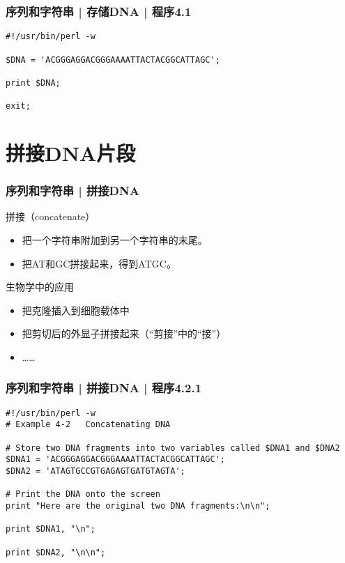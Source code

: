 \begin{frame}[fragile]
  \frametitle{序列和字符串 | 存储DNA | 程序4.1}
  \vspace{-1.5em}
\begin{lstlisting}
#!/usr/bin/perl -w

$DNA = 'ACGGGAGGACGGGAAAATTACTACGGCATTAGC';

print $DNA;

exit;
\end{lstlisting}
\end{frame}


\section{拼接DNA片段}
\begin{frame}
  \frametitle{序列和字符串 | 拼接DNA}
  \begin{block}{拼接（concatenate）}
    \begin{itemize}
      \item 把一个字符串附加到另一个字符串的末尾。
      \item 把AT和GC拼接起来，得到ATGC。
    \end{itemize}
  \end{block}
  \pause
  \begin{block}{生物学中的应用}
    \begin{itemize}
      \item 把克隆插入到细胞载体中
      \item 把剪切后的外显子拼接起来（“剪接”中的“接”）
      \item ……
    \end{itemize}
  \end{block}
\end{frame}

\begin{frame}[fragile,label=exam4.2.1]
  \frametitle{序列和字符串 | 拼接DNA | 程序4.2.1}
  \vspace{-1.5em}
\begin{lstlisting}
#!/usr/bin/perl -w
# Example 4-2   Concatenating DNA

# Store two DNA fragments into two variables called $DNA1 and $DNA2
$DNA1 = 'ACGGGAGGACGGGAAAATTACTACGGCATTAGC';
$DNA2 = 'ATAGTGCCGTGAGAGTGATGTAGTA';

# Print the DNA onto the screen
print "Here are the original two DNA fragments:\n\n";

print $DNA1, "\n";

print $DNA2, "\n\n";
\end{lstlisting}
\end{frame}

